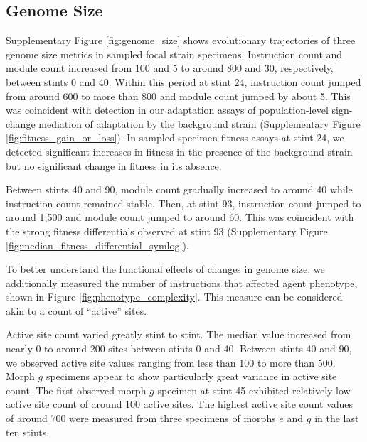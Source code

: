\subsection{Genome Size}

Supplementary Figure \ref{fig:genome_size} shows evolutionary trajectories of three genome size metrics in sampled focal strain specimens.
Instruction count and module count increased from 100 and 5 to around 800 and 30, respectively, between stints 0 and 40.
Within this period at stint 24, instruction count jumped from around 600 to more than 800 and module count jumped by about 5.
This was coincident with detection in our adaptation assays of population-level sign-change mediation of adaptation by the background strain (Supplementary Figure \ref{fig:fitness_gain_or_loss}).
In sampled specimen fitness assays at stint 24, we detected significant increases in fitness in the presence of the background strain but no significant change in fitness in its absence.

Between stints 40 and 90, module count gradually increased to around 40 while instruction count remained stable.
Then, at stint 93, instruction count jumped to around 1,500 and module count jumped to around 60.
This was coincident with the strong fitness differentials observed at stint 93 (Supplementary Figure \ref{fig:median_fitness_differential_symlog}).

To better understand the functional effects of changes in genome size, we additionally measured the number of instructions that affected agent phenotype, shown in Figure \ref{fig:phenotype_complexity}.
This measure can be considered akin to a count of ``active'' sites.

Active site count varied greatly stint to stint.
The median value increased from nearly 0 to around 200 sites between stints 0 and 40.
Between stints 40 and 90, we observed active site values ranging from less than 100 to more than 500.
Morph $g$ specimens appear to show particularly great variance in active site count.
The first observed morph $g$ specimen at stint 45 exhibited relatively low active site count of around 100 active sites.
The highest active site count values of around 700 were measured from three specimens of morphs $e$ and $g$ in the last ten stints.

